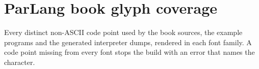 \documentclass[11pt]{article}
\begin{document}
\section*{ParLang book glyph coverage}
Every distinct non-ASCII code point used by the book sources, the example
programs and the generated interpreter dumps, rendered in each font family.
A code point missing from every font stops the build with an error that
names the character.


\end{document}
